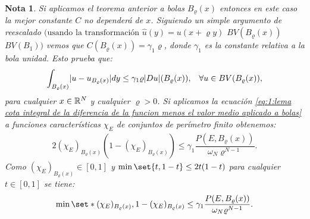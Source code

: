 \documentclass[a4paper,11pt,spanish, twoside, leqno]{tfm-uam}
\newtheorem{nota}[teo]{Nota}
\begin{document}
\begin{nota}
Si aplicamos el teorema anterior a bolas $B_{\varrho}(x)$ entonces en este caso la mejor constante $C$ no dependerá de $x$. Siguiendo un simple argumento de reescalado $(\text{usando la transformación } \hat{u}(y)=u(x+\varrho y)$  $BV(B_{\varrho}(x))$  $BV(B_{1}))$ vemos que $C(B_{\varrho}(x))=\gamma_{1}\varrho$, donde $\gamma_{1}$ es la constante relativa a la bola unidad. Esto prueba que:
\begin{align}\label{eq:1:lema cota integral de la diferencia de la funcion menos el valor medio aplicado a bolas}
\begin{array}{ll}
\displaystyle
\int_{B_{\varrho}(x)}\lvert u-u_{B_{\varrho}(x)}\rvert dy\leq \gamma_{1}\varrho\lvert Du\rvert(B_{\varrho}(x)),& \forall u \in BV(B_{\varrho}(x)),
\end{array}
\end{align}
para cualquier $x\in \mathbb{R}^{N}$ y cualquier $\varrho>0$. Si aplicamos la ecuación \ref{eq:1:lema cota integral de la diferencia de la funcion menos el valor medio aplicado a bolas} a funciones características $\chi_{E}$ de conjuntos de perímetro finito obtenemos:
\begin{align*}
2(\chi_{E})_{B_{\varrho}(x)}(1-(\chi_{E})_{B_{\varrho}(x)})\leq \gamma_{1} \dfrac{P(E,B_{\varrho}(x))}{\omega_{N}\varrho^{N-1}}.
\end{align*}
Como $(\chi_{E})_{B_{\varrho}(x)}\in [0,1]$ y $\min{\set{t,1-t}}\leq 2t(1-t)$ para cualquier $t\in [0,1]$ se tiene:
\begin{align}\label{eq:1:desigualdad isoperimetrica local}
\min\set*{(\chi_{E})_{B_{\varrho}(x)}, 1-(\chi_{E})_{B_{\varrho}(x)}}\leq \gamma_{1}\dfrac{P(E, B_{\varrho}(x))}{\omega_{N}\varrho^{N-1}}.
\end{align}
\end{nota}
\end{document}
